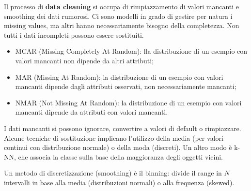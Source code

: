 Il processo di \textbf{data cleaning} si occupa di rimpiazzamento di valori mancanti e smoothing dei dati rumorosi. Ci sono modelli in grado di gestire per natura i missing values, ma altri hanno necessariamente bisogno della completezza. Non tutti i dati incompleti possono essere sostituiti.
\begin{itemize}
	\item MCAR (Missing Completely At Random): lla distribuzione di un esempio con valori mancanti non dipende da altri attributi;
	\item MAR (Missing At Random): la distribuzione di un esempio con valori mancanti dipende dagli attributi osservati, non necessariamente mancanti;
	\item NMAR (Not Missing At Random): la distribuzione di un esempio con valori mancanti dipende da attributi con valori mancanti.
\end{itemize}

I dati mancanti si possono ignorare, convertire a valori di default o rimpiazzare. Alcune tecniche di sostituzione implicano l'utilizzo della media (per valori continui con distribuzione normale) o della moda (discreti). Un altro modo è k-NN, che associa la classe sulla base della maggioranza degli oggetti vicini.

Un metodo di discretizzazione (smoothing) è il binning: divide il range in $N$ intervalli in base alla media (distribuzioni normali) o alla frequenza (skewed).



